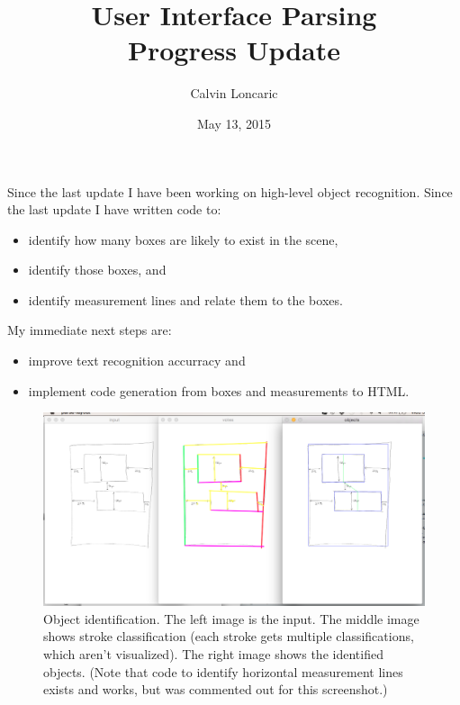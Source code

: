 \documentclass{article}
\title{User Interface Parsing \\ \small{Progress Update}}
\author{Calvin Loncaric}
\date{May 13, 2015}
\begin{document}
\maketitle

\noindent Since the last update I have been working on high-level object
recognition. Since the last update I have written code to:
\begin{itemize}
\item identify how many boxes are likely to exist in the scene,
\item identify those boxes, and
\item identify measurement lines and relate them to the boxes.
\end{itemize}

\noindent My immediate next steps are:
\begin{itemize}
\item improve text recognition accurracy and
\item implement code generation from boxes and measurements to HTML.
\end{itemize}

\begin{figure}
    \includegraphics[width=\textwidth]{progress-2015-05-13-screenshot.png}
    \caption{Object identification. The left image is the input. The middle
        image shows stroke classification (each stroke gets multiple
        classifications, which aren't visualized). The right image shows the
        identified objects. (Note that code to identify horizontal measurement
        lines exists and works, but was commented out for this screenshot.)}
    \label{fig:screenshot}
\end{figure}
\end{document}
